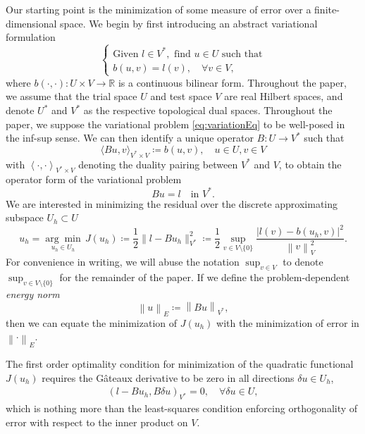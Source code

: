 \documentclass[final,leqno]{siamltex}
\newcommand{\eqnlab}[1]{\label{eq:#1}}
\newcommand{\eqnref}[1]{\eqref{eq:#1}}
\newcommand{\mbb}[1]{\mathbb{#1}}
\newcommand{\nor}[1]{\left\| #1 \right\|}
\newcommand{\LRp}[1]{\left( #1 \right)}
\newcommand{\LRa}[1]{\left\langle #1 \right\rangle}
\begin{document}
Our starting point is the minimization of some measure of error over a finite-dimensional space.  We begin by first introducing an abstract variational formulation 
\begin{equation}
\eqnlab{variationEq}
\left\{
  \begin{array}{l}
    \text{Given } l \in V^*, \text{ find } u \in U  \text{ such that} \\ 
    b(u,v) = l(v), \quad \forall v\in V,
  \end{array}
  \right.
\end{equation}
where $b\LRp{\cdot,\cdot}: U \times V \to \mbb{R}$ is a continuous bilinear form.  Throughout the paper, we assume that the trial space $U$ and test space $V$ are real Hilbert spaces, and denote $U^*$ and $V^*$ as the respective topological dual spaces.  Throughout the paper, we suppose the variational problem \eqnref{variationEq} to be well-posed in the inf-sup sense. We can then identify a unique operator $B:U\rightarrow V^*$ such that 
\[
\langle Bu,v\rangle_{V^* \times V} \coloneqq b(u,v), \quad u\in U, v\in V
\]
with $\LRa{\cdot, \cdot}_{V^*\times V}$ denoting the duality pairing between $V^*$ and $V$, to obtain the operator form of the variational problem
\begin{equation}
\eqnlab{dualEq}
Bu = l \quad \text{in } V^*.
\end{equation}
We are interested in minimizing the residual over the discrete approximating subspace $U_h \subset U$
\[
u_h = \underset{u_h\in U_h}{\arg\min}\, J(u_h) \coloneqq \frac{1}{2}\|l-Bu_h\|_{V^*}^2 \coloneqq\frac{1}{2} \sup_{v\in V\setminus\{0\}} \frac{| l(v)- b(u_h,v)|^2}{\nor{v}_V^2}.
\]
For convenience in writing, we will abuse the notation $\sup_{v \in V}$ to denote $\sup_{v\in V\setminus\{0\}}$ for the remainder of the paper.  If we define the problem-dependent \textit{energy norm} 
\[
\nor{u}_E \coloneqq \nor{Bu}_{V^*},
\]
then we can equate the minimization of $J(u_h)$ with the minimization of error in $\nor{\cdot}_E$. 

The first order optimality condition for minimization of the quadratic functional $J(u_h)$ requires the G\^ateaux derivative to be zero in all directions $\delta u \in U_h$,
\begin{align}
\left(l-Bu_h,B\delta u\right)_{V^*} = 0, \quad \forall \delta u \in U,
\label{orthog}
\end{align}
which is nothing more than the least-squares condition enforcing orthogonality of error with respect to the inner product on $V$.  
\end{document}
